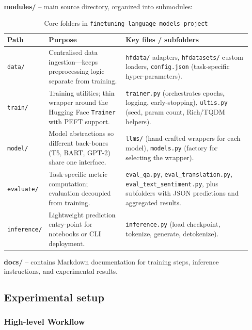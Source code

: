 \textbf{modules/} – main source directory, organized into submodules:
\begin{table}[htbp]
\centering
\caption{Core folders in \texttt{finetuning-language-models-project}}
\begin{tabularx}{\textwidth}{@{} l X X @{}}
\toprule
\textbf{Path} &
\textbf{Purpose} &
\textbf{Key files / subfolders} \\
\midrule
\texttt{data/} &
Centralised data ingestion—keeps preprocessing logic separate from training. &
\texttt{hfdata/} adapters, \texttt{hfdatasets/} custom loaders, \texttt{config.json} (task-specific hyper-parameters). \\[0.6em]

\texttt{train/} &
Training utilities; thin wrapper around the Hugging Face \texttt{Trainer} with PEFT support. &
\texttt{trainer.py} (orchestrates epochs, logging, early-stopping), \texttt{ultis.py} (seed, param count, Rich/TQDM helpers). \\[0.6em]

\texttt{model/} &
Model abstractions so different back-bones (T5, BART, GPT-2) share one interface. &
\texttt{llms/} (hand-crafted wrappers for each model), \texttt{models.py} (factory for selecting the wrapper). \\[0.6em]

\texttt{evaluate/} &
Task-specific metric computation; evaluation decoupled from training. &
\texttt{eval\_qa.py}, \texttt{eval\_translation.py}, \texttt{eval\_text\_sentiment.py}, plus subfolders with JSON predictions and aggregated results. \\[0.6em]

\texttt{inference/} &
Lightweight prediction entry-point for notebooks or CLI deployment. &
\texttt{inference.py} (load checkpoint, tokenize, generate, detokenize). \\
\bottomrule
\end{tabularx}
\end{table}


\textbf{docs/} – contains Markdown documentation for training steps, inference instructions, and experimental results.

\subsection{Experimental setup}
\subsubsection{High-level Workflow}

